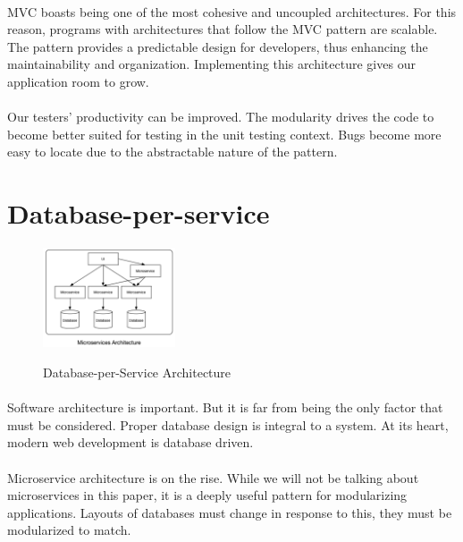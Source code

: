 \documentclass{turabian-researchpaper}
\begin{document}
\paragraph{}
MVC boasts being one of the most cohesive and uncoupled architectures.\cite{wikipedia_2020} For this reason, programs with architectures that follow the MVC pattern are scalable. The pattern provides a predictable design for developers, thus enhancing the maintainability and organization. Implementing this architecture gives our application room to grow.
\par
\paragraph{}
Our testers’ productivity can be improved. The modularity drives the code to become better suited for testing in the unit testing context. Bugs become more easy to locate due to the abstractable nature of the pattern. 
\cite{UnitTesting}\cite{wikipedia_2020}
\par
\endsubsection
\endsection


\section{Database-per-service}
\begin{figure}
\centering
\includegraphics[width=0.35\textwidth]{pics/db.png}
\caption{Database-per-Service Architecture}\cite{mjaglan.github.io}
\end{figure}
\paragraph{}
Software architecture is important. But it is far from being the only factor that must be considered. Proper database design is integral to a system. At its heart, modern web development is database driven.
\cite{sullivan}\cite{plainoldobjects_2015}
\par
\paragraph{}
Microservice architecture is on the rise. While we will not be talking about microservices in this paper, it is a deeply useful pattern for modularizing applications. Layouts of databases must change in response to this, they must be modularized to match.\cite{microservices.io}
\par
\end{document}

